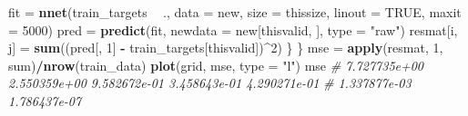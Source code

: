 \documentclass[10pt,ignorenonframetext,]{beamer}
\newenvironment{Shaded}{\begin{snugshade}}{\end{snugshade}}
\newcommand{\CommentTok}[1]{\textcolor[rgb]{0.56,0.35,0.01}{\textit{#1}}}
\newcommand{\DataTypeTok}[1]{\textcolor[rgb]{0.13,0.29,0.53}{#1}}
\newcommand{\DecValTok}[1]{\textcolor[rgb]{0.00,0.00,0.81}{#1}}
\newcommand{\KeywordTok}[1]{\textcolor[rgb]{0.13,0.29,0.53}{\textbf{#1}}}
\newcommand{\NormalTok}[1]{#1}
\newcommand{\OperatorTok}[1]{\textcolor[rgb]{0.81,0.36,0.00}{\textbf{#1}}}
\newcommand{\OtherTok}[1]{\textcolor[rgb]{0.56,0.35,0.01}{#1}}
\newcommand{\StringTok}[1]{\textcolor[rgb]{0.31,0.60,0.02}{#1}}
\begin{document}
\begin{frame}[fragile]
\begin{Shaded}
\begin{Highlighting}[]
\NormalTok{        fit =}\StringTok{ }\KeywordTok{nnet}\NormalTok{(train_targets }\OperatorTok{~}\StringTok{ }\NormalTok{., }\DataTypeTok{data =}\NormalTok{ new, }\DataTypeTok{size =}\NormalTok{ thissize, }\DataTypeTok{linout =} \OtherTok{TRUE}\NormalTok{, }
            \DataTypeTok{maxit =} \DecValTok{5000}\NormalTok{)}
\NormalTok{        pred =}\StringTok{ }\KeywordTok{predict}\NormalTok{(fit, }\DataTypeTok{newdata =}\NormalTok{ new[thisvalid, ], }\DataTypeTok{type =} \StringTok{"raw"}\NormalTok{)}
\NormalTok{        resmat[i, j] =}\StringTok{ }\KeywordTok{sum}\NormalTok{((pred[, }\DecValTok{1}\NormalTok{] }\OperatorTok{-}\StringTok{ }\NormalTok{train_targets[thisvalid])}\OperatorTok{^}\DecValTok{2}\NormalTok{)}
\NormalTok{    \}}
\NormalTok{\}}
\NormalTok{mse =}\StringTok{ }\KeywordTok{apply}\NormalTok{(resmat, }\DecValTok{1}\NormalTok{, sum)}\OperatorTok{/}\KeywordTok{nrow}\NormalTok{(train_data)}
\KeywordTok{plot}\NormalTok{(grid, mse, }\DataTypeTok{type =} \StringTok{"l"}\NormalTok{)}
\NormalTok{mse}
\CommentTok{# 7.727735e+00 2.550359e+00 9.582672e-01 3.458643e-01 4.290271e-01}
\CommentTok{# 1.337877e-03 1.786437e-07}
\end{Highlighting}
\end{Shaded}

\end{frame}
\end{document}
